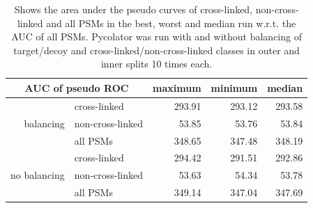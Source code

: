 \normalsize
\begin{table}[htbp]
	\centering	
	\caption[Area under the pseudo ROC curves with and without balancing of classes]{Shows the area under the pseudo curves of cross-linked, non-cross-linked and all PSMs in the best, worst and median run w.r.t. the AUC of all PSMs. Pycolator was run with and without balancing of target/decoy and cross-linked/non-cross-linked classes in outer and inner splits 10 times each.}
	\begin{tabular}{r|l||rrr}
		\multicolumn{2}{c}{AUC of pseudo ROC} & maximum & minimum & median \\
		\hline
		\multirow{3}[0]{*}{balancing} & cross-linked & 293.91 & 293.12 & 293.58 \\
		& non-cross-linked & 53.85 & 53.76 & 53.84 \\
		& all PSMs & 348.65 & 347.48 & 348.19 \\
		\hline
		\multirow{3}[0]{*}{no balancing} & cross-linked & 294.42 & 291.51 & 292.86 \\
		& non-cross-linked & 53.63 & 54.34 & 53.78 \\
		& all PSMs & 349.14 & 347.04 & 347.69 \\
	\end{tabular}
	\label{tab:results:maxminmedian}
\end{table}
\renewcommand{\baselinestretch}{1}

